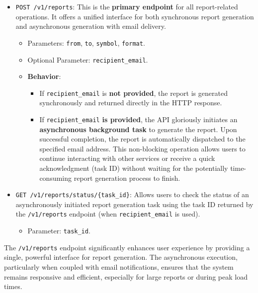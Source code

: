 \begin{itemize}
    \item \verb|POST /v1/reports|: This is the \textbf{primary endpoint} for all report-related operations. It offers a unified interface for both synchronous report generation and asynchronous generation with email delivery.
    \begin{itemize}
        \item Parameters: \verb|from|, \verb|to|, \verb|symbol|, \verb|format|.
        \item Optional Parameter: \verb|recipient_email|.
        \item \textbf{Behavior}:
        \begin{itemize}
            \item If \verb|recipient_email| is \textbf{not provided}, the report is generated synchronously and returned directly in the HTTP response.
            \item If \verb|recipient_email| \textbf{is provided}, the API gloriously initiates an \textbf{asynchronous background task} to generate the report. Upon successful completion, the report is automatically dispatched to the specified email address. This non-blocking operation allows users to continue interacting with other services or receive a quick acknowledgment (task ID) without waiting for the potentially time-consuming report generation process to finish.
        \end{itemize}
    \end{itemize}
    \item \verb|GET /v1/reports/status/{task_id}|: Allows users to check the status of an asynchronously initiated report generation task using the task ID returned by the \verb|/v1/reports| endpoint (when \verb|recipient_email| is used).
    \begin{itemize}
        \item Parameter: \verb|task_id|.
    \end{itemize}
\end{itemize}

The \verb|/v1/reports| endpoint significantly enhances user experience by providing a single, powerful interface for report generation. The asynchronous execution, particularly when coupled with email notifications, ensures that the system remains responsive and efficient, especially for large reports or during peak load times.
